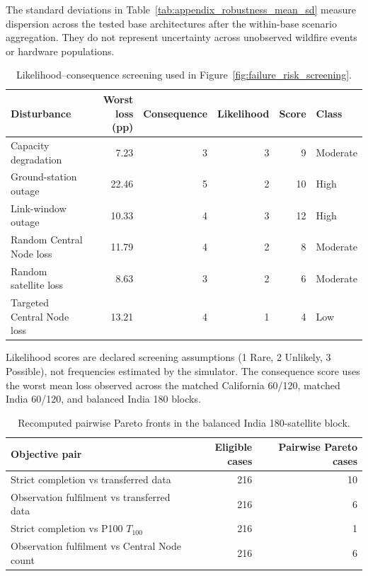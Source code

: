 The standard deviations in Table~\ref{tab:appendix_robustness_mean_sd} measure dispersion across the tested base architectures after the within-base scenario aggregation. They do not represent uncertainty across unobserved wildfire events or hardware populations.

\begin{table}[H]
\centering
\small
\caption{Likelihood--consequence screening used in Figure~\ref{fig:failure_risk_screening}.}
\label{tab:appendix_risk_screening}
\begin{tabularx}{\textwidth}{YrrrrL{0.14\textwidth}}
\toprule
Disturbance & Worst loss (pp) & Consequence & Likelihood & Score & Class \\
\midrule
Capacity degradation & 7.23 & 3 & 3 & 9 & Moderate \\
Ground-station outage & 22.46 & 5 & 2 & 10 & High \\
Link-window outage & 10.33 & 4 & 3 & 12 & High \\
Random Central Node loss & 11.79 & 4 & 2 & 8 & Moderate \\
Random satellite loss & 8.63 & 3 & 2 & 6 & Moderate \\
Targeted Central Node loss & 13.21 & 4 & 1 & 4 & Low \\
\bottomrule
\end{tabularx}
\end{table}

Likelihood scores are declared screening assumptions (1 Rare, 2 Unlikely, 3 Possible), not frequencies estimated by the simulator. The consequence score uses the worst mean loss observed across the matched California 60/120, matched India 60/120, and balanced India 180 blocks.

\begin{table}[H]
\centering
\caption{Recomputed pairwise Pareto fronts in the balanced India 180-satellite block.}
\label{tab:appendix_pairwise_pareto}
\begin{tabularx}{\textwidth}{Yrr}
\toprule
Objective pair & Eligible cases & Pairwise Pareto cases \\
\midrule
Strict completion vs transferred data & 216 & 10 \\
Observation fulfilment vs transferred data & 216 & 6 \\
Strict completion vs P100 $T_{100}$ & 216 & 1 \\
Observation fulfilment vs Central Node count & 216 & 6 \\
\bottomrule
\end{tabularx}
\end{table}

